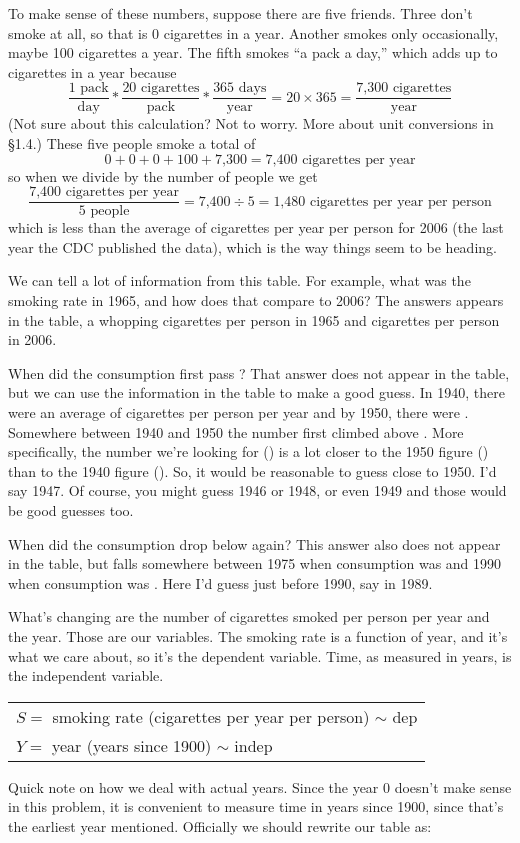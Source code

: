 To make sense of these numbers, suppose there are five friends.  Three don't smoke at all, so that is 0 cigarettes in a year.  Another smokes only occasionally, maybe 100 cigarettes a year.  The fifth smokes ``a pack a day,''  which adds up to  cigarettes in a year because
$$\frac{1\text{ pack}}{\text{day}} \ast \frac{20\text{ cigarettes}}{\text{pack}} 
\ast \frac{365 \text{ days}}{\text{year}} 
=20 \times 365
= \frac{\text{7,300 cigarettes}}{\text{year}} $$
(Not sure about this calculation?  Not to worry.  More about unit conversions in \S1.4.) %
These five people smoke a total of $$0+0+0+100+\text{7,300}=\text{7,400 cigarettes per year}$$
so when we divide by the number of people we get
$$\frac{\text{7,400 cigarettes per year}}{5 \text{ people}} = \text{7,400} \div 5 = \text{1,480 cigarettes per year per person}$$
which is less than the average of  cigarettes per year per person for 2006 (the last year the CDC published the data), which is the way things seem to be heading. 

We can tell a lot of information from this table.  For example, what was the smoking rate in 1965, and how does that compare to 2006?  The answers appears in the table, a whopping  cigarettes per person in 1965 and  cigarettes per person in 2006.

When did the consumption first pass ?  That answer does not appear in the table, but we can use the information in the table to make a good guess.  In 1940, there were an average of  cigarettes per person per year and by 1950, there were .  Somewhere between 1940 and 1950 the number first climbed above .  More specifically, the number we're looking for () is a lot closer to the 1950 figure () than to the 1940 figure ().  So, it would be reasonable to guess close to 1950.  I'd say 1947.  Of course, you might guess 1946 or 1948, or even 1949 and those would be good guesses too.  

When did the consumption drop below  again?  This answer also does not appear in the table, but falls somewhere between 1975 when consumption was  and 1990 when consumption was   .  Here I'd guess just before 1990, say in 1989.   

What's changing are the number of cigarettes smoked per person per year and the year.  Those are our variables.  The smoking rate is a function of year, and it's what we care about, so it's the dependent variable.  Time, as measured in years, is the independent variable.   
\begin{center}
\begin{tabular} {l}
$S=$ smoking rate (cigarettes per year per person) $\sim$ dep \\
$Y= $ year (years since 1900) $\sim$ indep \\ 
\end{tabular}
\end{center}
Quick note on how we deal with actual years.  Since the year 0 doesn't make sense in this problem, it is convenient to measure time in years since 1900, since that's the earliest year mentioned. Officially we should rewrite our table as:

